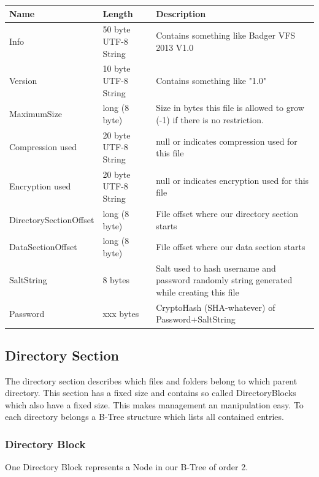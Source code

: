 \begin{tabular}{|l|l|p{5cm}|}
\hline
  \textbf{Name} & \textbf{Length} & \textbf{Description}
\\  \hline
  Info & 50 byte UTF-8 String & Contains something like Badger VFS 2013 V1.0 
\\ \hline
  Version & 10 byte UTF-8 String & Contains something like "1.0"
\\ \hline
  MaximumSize & long (8 byte) & Size in bytes this file is allowed to grow (-1) if there is no restriction. 
\\ \hline
  Compression used & 20 byte UTF-8 String & null or indicates compression used for this file
\\ \hline
  Encryption used & 20 byte UTF-8 String & null or indicates encryption used for this file
\\ \hline
 DirectorySectionOffset & long (8 byte) &  File offset where our directory section
 starts \\ \hline
 DataSectionOffset & long (8 byte) &  File offset where our data section starts
\\ \hline
 SaltString & 8 bytes  & Salt used to hash username and password randomly string generated while creating this
   file
 \\ \hline
  Password & xxx bytes  & CryptoHash (SHA-whatever) of Password+SaltString
\\ \hline

\end{tabular}


\subsection{Directory Section}

The directory section describes which files and folders belong to which parent directory. This section has a fixed size and contains so called DirectoryBlocks which also have a fixed size. This makes management an manipulation easy. To each directory belongs a B-Tree structure which lists all contained entries.


\subsubsection*{Directory Block}

One Directory Block represents a Node in our B-Tree of order 2.

